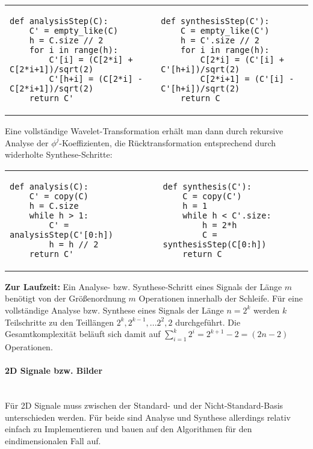 \begin{adjustbox}{max width=\textwidth ,center}
\begin{tabular}{p{}|p{}}
\begin{verbatim}
def analysisStep(C):
    C' = empty_like(C)
    h = C.size // 2
    for i in range(h):
        C'[i] = (C[2*i] + C[2*i+1])/sqrt(2)
        C'[h+i] = (C[2*i] - C[2*i+1])/sqrt(2)
    return C'
\end{verbatim}
&
\begin{verbatim}
def synthesisStep(C'):
    C = empty_like(C')
    h = C'.size // 2
    for i in range(h):
        C[2*i] = (C'[i] + C'[h+i])/sqrt(2)
        C[2*i+1] = (C'[i] - C'[h+i])/sqrt(2)
    return C
\end{verbatim}
\\
\end{tabular}
\end{adjustbox}

\noindent Eine vollständige Wavelet-Transformation erhält man dann durch rekursive Analyse der $\phi^{j}$-Koeffizienten, die Rücktransformation entsprechend durch widerholte Synthese-Schritte:

\begin{adjustbox}{max width=\textwidth ,center}
\begin{tabular}{p{}|p{}}
\begin{verbatim}
def analysis(C):
    C' = copy(C)
    h = C.size
    while h > 1:
        C' = analysisStep(C'[0:h])
        h = h // 2
    return C'
\end{verbatim}
&
\begin{verbatim}
def synthesis(C'):
    C = copy(C')
    h = 1
    while h < C'.size:
        h = 2*h
        C = synthesisStep(C[0:h])
    return C
\end{verbatim}
\\
\end{tabular}
\end{adjustbox}

\noindent \textbf{Zur Laufzeit:} Ein Analyse- bzw. Synthese-Schritt eines Signals der Länge $m$ benötigt von der Größenordnung $m$ Operationen innerhalb der Schleife. Für eine vollständige Analyse bzw. Synthese eines Signals der Länge $n=2^k$ werden $k$ Teilschritte zu den Teillängen $2^k, 2^{k-1}, ... 2^2, 2$ durchgeführt. Die Gesamtkomplexität beläuft sich damit auf $\sum_{i=1}^k 2^i = 2^{k+1}-2 = (2n-2)$ Operationen.
%
\paragraph{2D Signale bzw. Bilder}~\\
Für 2D Signale muss zwischen der Standard- und der Nicht-Standard-Basis unterschieden werden. Für beide sind Analyse und Synthese allerdings relativ einfach zu Implementieren und bauen auf den Algorithmen für den eindimensionalen Fall auf.

